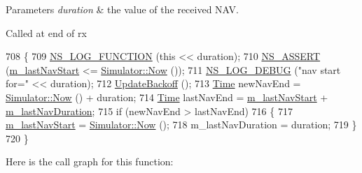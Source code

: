 \begin{DoxyParams}{Parameters}
{\em duration} & the value of the received N\+AV.\\
\hline
\end{DoxyParams}
Called at end of rx 
\begin{DoxyCode}
708 \{
709   \hyperlink{log-macros-disabled_8h_a90b90d5bad1f39cb1b64923ea94c0761}{NS\_LOG\_FUNCTION} (\textcolor{keyword}{this} << duration);
710   \hyperlink{assert_8h_a6dccdb0de9b252f60088ce281c49d052}{NS\_ASSERT} (\hyperlink{classns3_1_1DcfManager_a9b355425c50b92120b02980aedd14c8b}{m\_lastNavStart} <= \hyperlink{classns3_1_1Simulator_ac3178fa975b419f7875e7105be122800}{Simulator::Now} ());
711   \hyperlink{group__logging_ga413f1886406d49f59a6a0a89b77b4d0a}{NS\_LOG\_DEBUG} (\textcolor{stringliteral}{"nav start for="} << duration);
712   \hyperlink{classns3_1_1DcfManager_a8fb01b9608eeab857a38935045fd98b8}{UpdateBackoff} ();
713   \hyperlink{namespacens3_1_1TracedValueCallback_a7ffd3e7c142ffe7c8a1d2db9b8de38ec}{Time} newNavEnd = \hyperlink{classns3_1_1Simulator_ac3178fa975b419f7875e7105be122800}{Simulator::Now} () + duration;
714   \hyperlink{namespacens3_1_1TracedValueCallback_a7ffd3e7c142ffe7c8a1d2db9b8de38ec}{Time} lastNavEnd = \hyperlink{classns3_1_1DcfManager_a9b355425c50b92120b02980aedd14c8b}{m\_lastNavStart} + \hyperlink{classns3_1_1DcfManager_ac1345fd3e89ee2e0acb0665082669af7}{m\_lastNavDuration};
715   \textcolor{keywordflow}{if} (newNavEnd > lastNavEnd)
716     \{
717       \hyperlink{classns3_1_1DcfManager_a9b355425c50b92120b02980aedd14c8b}{m\_lastNavStart} = \hyperlink{classns3_1_1Simulator_ac3178fa975b419f7875e7105be122800}{Simulator::Now} ();
718       m\_lastNavDuration = duration;
719     \}
720 \}
\end{DoxyCode}


Here is the call graph for this function\+:


